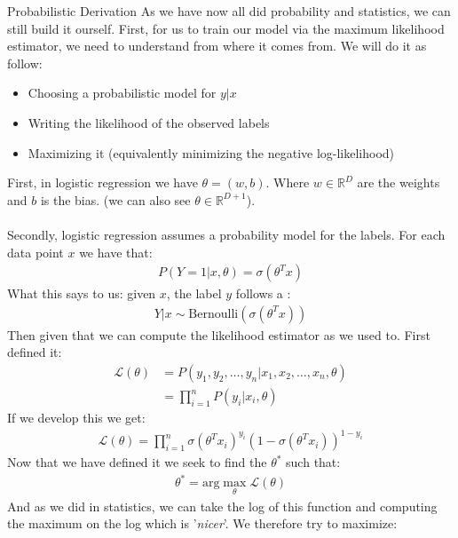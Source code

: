 \begin{parag}{Probabilistic Derivation}
    As we have now all did probability and statistics, we can still build it ourself. First, for us to train our model via the maximum likelihood estimator, we need to understand from where it comes from. We will do it as follow:
	\begin{itemize}
		\item Choosing a probabilistic model for $y | x$
		\item Writing the likelihood of the observed labels
		\item Maximizing it (equivalently minimizing the negative log-likelihood)
	\end{itemize}
	First, in logistic regression we have $\theta = \left(w, b\right)$.	Where $w \in \mathbb{R}^{D}$ are the weights and $b$ is the bias. (we can also see $\theta \in \mathbb{R}^{D + 1}$).\\
	$ $\\
	Secondly, logistic regression assumes a probability model for the labels. For each data point $x$ we have that:
	\begin{align*} 
		P\left(Y = 1 | x, \theta\right) =  \sigma\left(\theta^{T}x\right)
	\end{align*}
	What this says to us: given $x$, the label $y$ follows a :
	\begin{align*} 
		Y | x \sim \text{Bernoulli}\left(\sigma\left(\theta^{T}x\right)\right)
	\end{align*}
	Then given that we can compute the likelihood estimator as we used to. First defined it:
	\begin{align*} 
		\mathcal{L}\left(\theta\right) &= P\left(y_1, y_2, \ldots, y_n| x_1, x_2, \ldots, x_n, \theta\right)\\
									   &= \prod_{i = 1}^{n}P\left(y_i | x_i, \theta\right)
	\end{align*}
	If we develop this we get:
	\begin{align*} 
		\mathcal{L}\left(\theta\right) =  \prod_{i = 1}^{n} \sigma\left(\theta^{T}x_i\right)^{y_i}\left(1 - \sigma\left(\theta^{T}x_i\right)\right)^{1 - y_i}
	\end{align*}
	Now that we have defined it we seek to find the $\theta^{\ast}$ such that:
	\begin{align*} 
		\theta^{\ast} = \text{arg} \max_\theta \mathcal{L}\left(\theta\right)
	\end{align*}
	And as we did in statistics, we can take the log of this function and computing the maximum on the log which is '\textit{nicer}'. We therefore try to maximize:

\end{parag}
